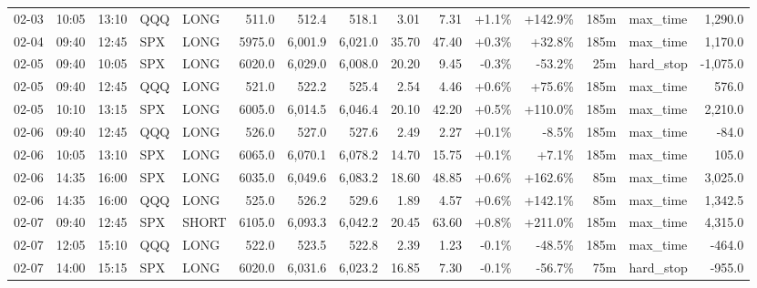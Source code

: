\documentclass[11pt,a4paper,twoside]{article}
\begin{document}
\begin{landscape}
\begin{center}
\begin{longtable}{>{\color{txtmain}}l l l l l r r r r r r r r >{\color{txtmain}}l r}
02-03 & 10:05 & 13:10 & QQQ & LONG & 511.0 & 512.4 & 518.1 & 3.01 & 7.31 & \textcolor{wingreen}{+1.1\%} & \textcolor{wingreen}{+142.9\%} & 185m & max\_time & \textcolor{wingreen}{1,290.0} \\
02-04 & 09:40 & 12:45 & SPX & LONG & 5975.0 & 6,001.9 & 6,021.0 & 35.70 & 47.40 & \textcolor{wingreen}{+0.3\%} & \textcolor{wingreen}{+32.8\%} & 185m & max\_time & \textcolor{wingreen}{1,170.0} \\
02-05 & 09:40 & 10:05 & SPX & LONG & 6020.0 & 6,029.0 & 6,008.0 & 20.20 & 9.45 & \textcolor{lossred}{-0.3\%} & \textcolor{lossred}{-53.2\%} & 25m & hard\_stop & \textcolor{lossred}{-1,075.0} \\
02-05 & 09:40 & 12:45 & QQQ & LONG & 521.0 & 522.2 & 525.4 & 2.54 & 4.46 & \textcolor{wingreen}{+0.6\%} & \textcolor{wingreen}{+75.6\%} & 185m & max\_time & \textcolor{wingreen}{576.0} \\
02-05 & 10:10 & 13:15 & SPX & LONG & 6005.0 & 6,014.5 & 6,046.4 & 20.10 & 42.20 & \textcolor{wingreen}{+0.5\%} & \textcolor{wingreen}{+110.0\%} & 185m & max\_time & \textcolor{wingreen}{2,210.0} \\
02-06 & 09:40 & 12:45 & QQQ & LONG & 526.0 & 527.0 & 527.6 & 2.49 & 2.27 & \textcolor{wingreen}{+0.1\%} & \textcolor{lossred}{-8.5\%} & 185m & max\_time & \textcolor{lossred}{-84.0} \\
02-06 & 10:05 & 13:10 & SPX & LONG & 6065.0 & 6,070.1 & 6,078.2 & 14.70 & 15.75 & \textcolor{wingreen}{+0.1\%} & \textcolor{wingreen}{+7.1\%} & 185m & max\_time & \textcolor{wingreen}{105.0} \\
02-06 & 14:35 & 16:00 & SPX & LONG & 6035.0 & 6,049.6 & 6,083.2 & 18.60 & 48.85 & \textcolor{wingreen}{+0.6\%} & \textcolor{wingreen}{+162.6\%} & 85m & max\_time & \textcolor{wingreen}{3,025.0} \\
02-06 & 14:35 & 16:00 & QQQ & LONG & 525.0 & 526.2 & 529.6 & 1.89 & 4.57 & \textcolor{wingreen}{+0.6\%} & \textcolor{wingreen}{+142.1\%} & 85m & max\_time & \textcolor{wingreen}{1,342.5} \\
02-07 & 09:40 & 12:45 & SPX & SHORT & 6105.0 & 6,093.3 & 6,042.2 & 20.45 & 63.60 & \textcolor{wingreen}{+0.8\%} & \textcolor{wingreen}{+211.0\%} & 185m & max\_time & \textcolor{wingreen}{4,315.0} \\
02-07 & 12:05 & 15:10 & QQQ & LONG & 522.0 & 523.5 & 522.8 & 2.39 & 1.23 & \textcolor{lossred}{-0.1\%} & \textcolor{lossred}{-48.5\%} & 185m & max\_time & \textcolor{lossred}{-464.0} \\
02-07 & 14:00 & 15:15 & SPX & LONG & 6020.0 & 6,031.6 & 6,023.2 & 16.85 & 7.30 & \textcolor{lossred}{-0.1\%} & \textcolor{lossred}{-56.7\%} & 75m & hard\_stop & \textcolor{lossred}{-955.0} \\

\end{longtable}
\end{center}
\end{landscape}
\end{document}

